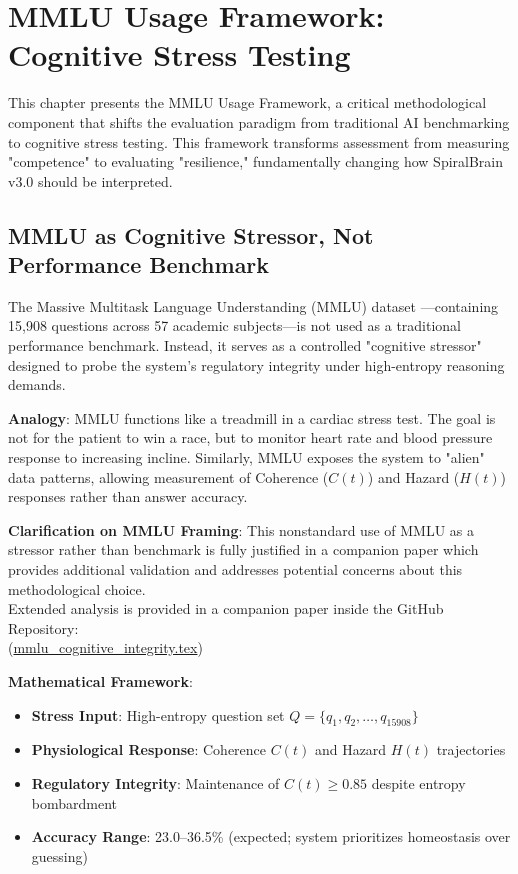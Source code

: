 \documentclass[12pt,a4paper]{report}
\begin{document}
\chapter{MMLU Usage Framework: Cognitive Stress Testing}

This chapter presents the MMLU Usage Framework, a critical methodological component that shifts the evaluation paradigm from traditional AI benchmarking to cognitive stress testing. This framework transforms assessment from measuring "competence" to evaluating "resilience," fundamentally changing how SpiralBrain v3.0 should be interpreted.

\section{MMLU as Cognitive Stressor, Not Performance Benchmark}

The Massive Multitask Language Understanding (MMLU) dataset \cite{hendrycks2020measuring}—containing 15,908 questions across 57 academic subjects—is not used as a traditional performance benchmark. Instead, it serves as a controlled "cognitive stressor" designed to probe the system's regulatory integrity under high-entropy reasoning demands.

\textbf{Analogy}: MMLU functions like a treadmill in a cardiac stress test. The goal is not for the patient to win a race, but to monitor heart rate and blood pressure response to increasing incline. Similarly, MMLU exposes the system to "alien" data patterns, allowing measurement of Coherence ($C(t)$) and Hazard ($H(t)$) responses rather than answer accuracy.

\textbf{Clarification on MMLU Framing}: This nonstandard use of MMLU as a stressor rather than benchmark is fully justified in a companion paper which provides additional validation and addresses potential concerns about this methodological choice. \\
Extended analysis is provided in a companion paper inside the GitHub Repository: \\ 
{\small (\href{https://github.com/jhcragin/SpiralBrain-v3.0-public/blob/main/mmlu_cognitive_integrity_clarification/mmlu_cognitive_integrity.tex}{mmlu\_cognitive\_integrity.tex})}



\textbf{Mathematical Framework}:
\begin{itemize}
    \item \textbf{Stress Input}: High-entropy question set $Q = \{q_1, q_2, \ldots, q_{15908}\}$

    \item \textbf{Physiological Response}: Coherence $C(t)$ and Hazard $H(t)$ trajectories

    \item \textbf{Regulatory Integrity}: Maintenance of $C(t) \ge 0.85$ despite entropy bombardment

    \item \textbf{Accuracy Range}: 23.0--36.5\% (expected; system prioritizes homeostasis over guessing)
\end{itemize}
\end{document}

